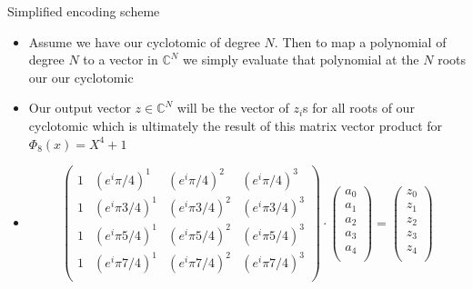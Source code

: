 \documentclass{beamer}
\begin{document}
\begin{frame}{Simplified encoding scheme}
	\begin{itemize}[<+->]
		\item Assume we have our cyclotomic of degree $N$. Then to map a polynomial of degree $N$ to
		a vector in $\mathbb{C}^N$ we simply evaluate that polynomial at the $N$ roots our our cyclotomic
		\item Our output vector $z \in \mathbb{C}^N$ will be the vector of $z_i$s for all roots of our cyclotomic
		which is ultimately the result of this matrix vector product for $\Phi_8(x) = X^4 + 1$
		\item 
		\begin{center}
			\[
			\begin{pmatrix}
				1 & (e^i\pi/4)^1 &  (e^i\pi/4)^2 &  (e^i\pi/4)^3\\  
				1 & (e^i\pi 3/4)^1 &  (e^i\pi 3/4)^2 &  (e^i\pi 3/4)^3 \\  
				1 & (e^i\pi 5/4)^1 &  (e^i\pi 5/4)^2 &  (e^i\pi 5/4)^3 \\  
				1 & (e^i\pi 7/4)^1 &  (e^i\pi 7/4)^2 &  (e^i\pi 7/4)^3 \\  
			\end{pmatrix} \cdot 
			\begin{pmatrix}
				a_0\\
				a_1\\
				a_2\\
				a_3\\
				a_4\\
			\end{pmatrix} =
			\begin{pmatrix}
				z_0\\
				z_1\\
				z_2\\
				z_3\\
				z_4\\
			\end{pmatrix}
			\]
		\end{center}
	\end{itemize}
\end{frame}
\end{document}
